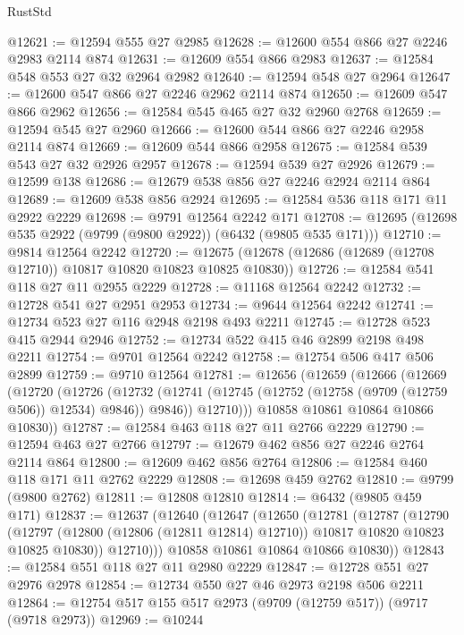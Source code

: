 \begin{lexlean}{RustStd}
\begin{coremodule}
@12621 := @12594 @555 @27 @2985
@12628 := @12600 @554 @866 @27 @2246 @2983 @2114 @874
@12631 := @12609 @554 @866 @2983
@12637 := @12584 @548 @553 @27 @32 @2964 @2982
@12640 := @12594 @548 @27 @2964
@12647 := @12600 @547 @866 @27 @2246 @2962 @2114 @874
@12650 := @12609 @547 @866 @2962
@12656 := @12584 @545 @465 @27 @32 @2960 @2768
@12659 := @12594 @545 @27 @2960
@12666 := @12600 @544 @866 @27 @2246 @2958 @2114 @874
@12669 := @12609 @544 @866 @2958
@12675 := @12584 @539 @543 @27 @32 @2926 @2957
@12678 := @12594 @539 @27 @2926
@12679 := @12599 @138
@12686 := @12679 @538 @856 @27 @2246 @2924 @2114 @864
@12689 := @12609 @538 @856 @2924
@12695 := @12584 @536 @118 @171 @11 @2922 @2229
@12698 := @9791 @12564 @2242 @171
@12708 := @12695 (@12698 @535 @2922 (@9799 (@9800 @2922)) (@6432 (@9805 @535 @171)))
@12710 := @9814 @12564 @2242
@12720 := @12675 (@12678 (@12686 (@12689 (@12708 @12710)) @10817 @10820 @10823 @10825 @10830))
@12726 := @12584 @541 @118 @27 @11 @2955 @2229
@12728 := @11168 @12564 @2242
@12732 := @12728 @541 @27 @2951 @2953
@12734 := @9644 @12564 @2242
@12741 := @12734 @523 @27 @116 @2948 @2198 @493 @2211
@12745 := @12728 @523 @415 @2944 @2946
@12752 := @12734 @522 @415 @46 @2899 @2198 @498 @2211
@12754 := @9701 @12564 @2242
@12758 := @12754 @506 @417 @506 @2899
@12759 := @9710 @12564
@12781 := @12656
    (@12659
      (@12666
        (@12669
          (@12720
            (@12726
              (@12732 (@12741 (@12745 (@12752 (@12758 (@9709 (@12759 @506)) @12534) @9846)) @9846))
              @12710)))
        @10858
        @10861
        @10864
        @10866
        @10830))
@12787 := @12584 @463 @118 @27 @11 @2766 @2229
@12790 := @12594 @463 @27 @2766
@12797 := @12679 @462 @856 @27 @2246 @2764 @2114 @864
@12800 := @12609 @462 @856 @2764
@12806 := @12584 @460 @118 @171 @11 @2762 @2229
@12808 := @12698 @459 @2762
@12810 := @9799 (@9800 @2762)
@12811 := @12808 @12810
@12814 := @6432 (@9805 @459 @171)
@12837 := @12637
    (@12640
      (@12647
        (@12650
          (@12781
            (@12787
              (@12790
                (@12797
                  (@12800 (@12806 (@12811 @12814) @12710))
                  @10817
                  @10820
                  @10823
                  @10825
                  @10830))
              @12710)))
        @10858
        @10861
        @10864
        @10866
        @10830))
@12843 := @12584 @551 @118 @27 @11 @2980 @2229
@12847 := @12728 @551 @27 @2976 @2978
@12854 := @12734 @550 @27 @46 @2973 @2198 @506 @2211
@12864 := @12754 @517 @155 @517 @2973 (@9709 (@12759 @517)) (@9717 (@9718 @2973))
@12969 := @10244

\end{coremodule}
\end{lexlean}
